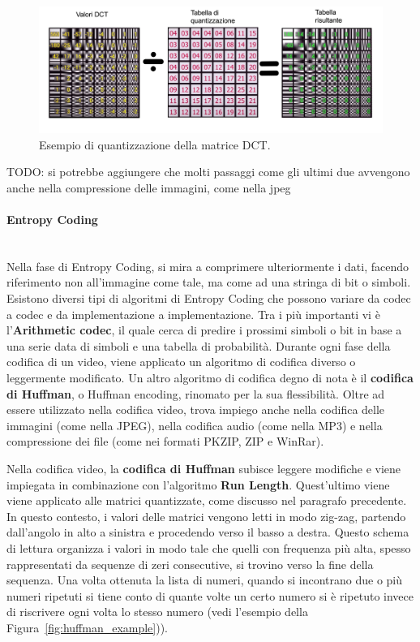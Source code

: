 \documentclass[a4paper,12pt, oneside]{article}
\begin{document}
\begin{figure}[h]
    \centering
    \includegraphics[width=1\textwidth]{images/quantization-example.png}
    \caption{Esempio di quantizzazione della matrice DCT.}
    \label{fig:quantization_example}
\end{figure}

TODO: si potrebbe aggiungere che molti passaggi come gli ultimi due avvengono anche nella compressione delle immagini, come nella jpeg

\paragraph{Entropy Coding}\hphantom{A}\\
Nella fase di Entropy Coding, si mira a comprimere ulteriormente i dati, facendo riferimento non
all'immagine come tale, ma come ad una stringa di bit o simboli. Esistono diversi tipi di
algoritmi di Entropy Coding che possono variare da codec a codec e da implementazione a implementazione.
Tra i più importanti vi è l'\textbf{Arithmetic codec}, il quale cerca di predire i prossimi
simboli o bit in base a una serie data di simboli e una tabella di probabilità. Durante ogni fase
della codifica di un video, viene applicato un algoritmo di codifica diverso o leggermente
modificato. Un altro algoritmo di codifica degno di nota è il \textbf{codifica di Huffman}, o
Huffman encoding, rinomato per la sua flessibilità. Oltre ad essere utilizzato nella codifica video,
trova impiego anche nella codifica delle immagini (come nella JPEG), nella codifica audio
(come nella MP3) e nella compressione dei file (come nei formati PKZIP, ZIP e WinRar).

Nella codifica video, la \textbf{codifica di Huffman} subisce leggere modifiche e viene impiegata
in combinazione con l'algoritmo \textbf{Run Length}. Quest'ultimo viene viene applicato alle matrici
quantizzate, come discusso nel paragrafo precedente. In questo contesto, i valori delle matrici vengono
letti in modo zig-zag, partendo dall'angolo in alto a sinistra e procedendo verso il basso a destra.
Questo schema di lettura organizza i valori in modo tale che quelli con frequenza più alta, spesso 
rappresentati da sequenze di zeri consecutive, si trovino verso la fine della sequenza. Una volta ottenuta
la lista di numeri, quando si incontrano due o più numeri ripetuti si tiene conto di quante volte un certo
numero si è ripetuto invece di riscrivere ogni volta lo stesso numero (vedi l'esempio della
Figura~\ref{fig:huffman_example})).
\end{document}
